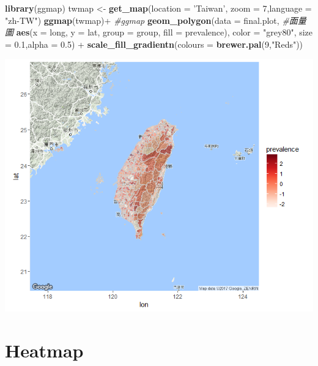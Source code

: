 \documentclass[]{book}
\newenvironment{Shaded}{\begin{snugshade}}{\end{snugshade}}
\newcommand{\KeywordTok}[1]{\textcolor[rgb]{0.13,0.29,0.53}{\textbf{{#1}}}}
\newcommand{\DataTypeTok}[1]{\textcolor[rgb]{0.13,0.29,0.53}{{#1}}}
\newcommand{\DecValTok}[1]{\textcolor[rgb]{0.00,0.00,0.81}{{#1}}}
\newcommand{\FloatTok}[1]{\textcolor[rgb]{0.00,0.00,0.81}{{#1}}}
\newcommand{\StringTok}[1]{\textcolor[rgb]{0.31,0.60,0.02}{{#1}}}
\newcommand{\CommentTok}[1]{\textcolor[rgb]{0.56,0.35,0.01}{\textit{{#1}}}}
\newcommand{\NormalTok}[1]{{#1}}
\theoremstyle{definition}
\theoremstyle{definition}
\theoremstyle{remark}
\begin{document}
\begin{Shaded}
\begin{Highlighting}[]
\KeywordTok{library}\NormalTok{(ggmap)}
\NormalTok{twmap <-}\StringTok{ }\KeywordTok{get_map}\NormalTok{(}\DataTypeTok{location =} \StringTok{'Taiwan'}\NormalTok{, }\DataTypeTok{zoom =} \DecValTok{7}\NormalTok{,}\DataTypeTok{language =} \StringTok{"zh-TW"}\NormalTok{)}
\KeywordTok{ggmap}\NormalTok{(twmap)+}\StringTok{ }\CommentTok{#ggmap}
\StringTok{    }\KeywordTok{geom_polygon}\NormalTok{(}\DataTypeTok{data =} \NormalTok{final.plot,  }\CommentTok{#面量圖}
        \KeywordTok{aes}\NormalTok{(}\DataTypeTok{x =} \NormalTok{long, }\DataTypeTok{y =} \NormalTok{lat, }\DataTypeTok{group =} \NormalTok{group, }\DataTypeTok{fill =} \NormalTok{prevalence), }
        \DataTypeTok{color =} \StringTok{"grey80"}\NormalTok{, }\DataTypeTok{size =} \FloatTok{0.1}\NormalTok{,}\DataTypeTok{alpha =} \FloatTok{0.5}\NormalTok{) +}\StringTok{ }
\KeywordTok{scale_fill_gradientn}\NormalTok{(}\DataTypeTok{colours =} \KeywordTok{brewer.pal}\NormalTok{(}\DecValTok{9}\NormalTok{,}\StringTok{"Reds"}\NormalTok{))}
\end{Highlighting}
\end{Shaded}

\includegraphics[width=9.32in]{figure/ggmapTaiwan}

\section{Heatmap}\label{heatmap}
\end{document}
